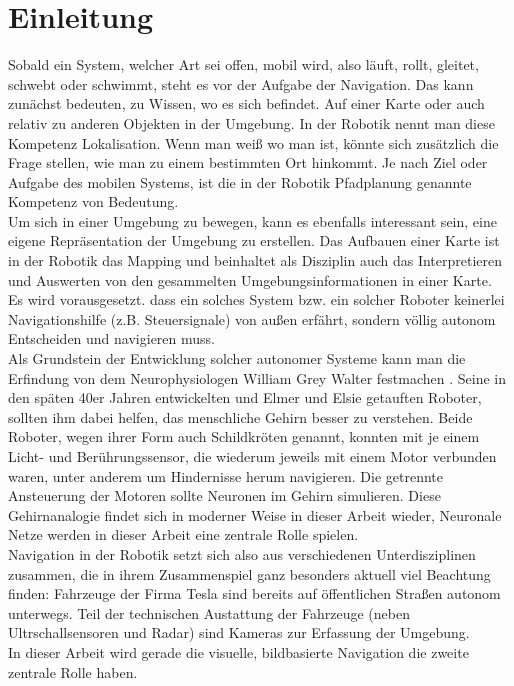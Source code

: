 %


\chapter{Einleitung}



Sobald ein System, welcher Art sei offen, mobil wird, also läuft, rollt, gleitet, schwebt oder schwimmt, steht es vor der Aufgabe der Navigation. Das kann zunächst bedeuten, zu Wissen, wo es sich befindet. Auf einer Karte oder auch relativ zu anderen Objekten in der Umgebung. In der Robotik nennt man diese Kompetenz Lokalisation. Wenn man weiß wo man ist, könnte sich zusätzlich die Frage stellen, wie man zu einem bestimmten Ort hinkommt. Je nach Ziel oder Aufgabe des mobilen Systems, ist die in der Robotik Pfadplanung genannte Kompetenz von Bedeutung.\\ Um sich in einer Umgebung zu bewegen, kann es ebenfalls interessant sein, eine eigene Repräsentation der Umgebung zu erstellen. Das Aufbauen einer Karte ist in der Robotik das Mapping und beinhaltet als Disziplin auch das Interpretieren und Auswerten von den gesammelten Umgebungsinformationen in einer Karte.\\
Es wird vorausgesetzt. dass ein solches System bzw. ein solcher Roboter keinerlei Navigationshilfe (z.B. Steuersignale) von außen erfährt, sondern völlig autonom Entscheiden und navigieren muss.\\
Als Grundstein der Entwicklung solcher autonomer Systeme kann man die Erfindung von dem Neurophysiologen William Grey Walter festmachen \cite{walter1950imitation}. Seine in den späten 40er Jahren entwickelten und \glqq Elmer \grqq{} und \glqq Elsie\grqq{} getauften Roboter, sollten ihm dabei helfen, das menschliche Gehirn besser zu verstehen. Beide Roboter, wegen ihrer Form auch Schildkröten genannt, konnten mit je einem Licht- und Berührungssensor, die wiederum jeweils mit einem Motor verbunden waren, unter anderem um Hindernisse herum navigieren. Die getrennte Ansteuerung der Motoren sollte Neuronen im Gehirn simulieren. Diese Gehirnanalogie findet sich in moderner Weise in dieser Arbeit wieder, Neuronale Netze werden in dieser Arbeit eine zentrale Rolle spielen.\\
Navigation in der Robotik setzt sich also aus verschiedenen Unterdisziplinen zusammen, die in ihrem Zusammenspiel ganz besonders aktuell viel Beachtung finden: Fahrzeuge der Firma Tesla sind bereits auf öffentlichen Straßen autonom unterwegs. Teil der technischen Austattung der Fahrzeuge (neben Ultrschallsensoren und Radar) sind Kameras zur Erfassung der Umgebung. \\
In dieser Arbeit wird gerade die visuelle, bildbasierte Navigation die zweite zentrale Rolle haben.


